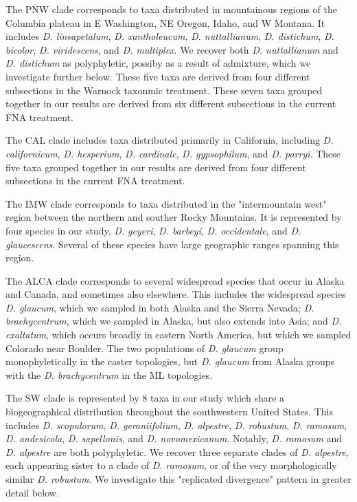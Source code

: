 \documentclass[11pt]{article}
\begin{document}
The PNW clade corresponds to taxa distributed in mountainous regions of the Columbia 
plateau in E Washington, NE Oregon, Idaho, and W Montana. It includes \emph{D. lineapetalum}, 
\emph{D. xantholeucum}, \emph{D. nuttallianum}, \emph{D. distichum}, \emph{D. bicolor}, 
\emph{D. viridescens}, and \emph{D. multiplex}. We recover both \emph{D. nuttallianum}
and \emph{D. distichum} as polyphyletic, possiby as a result of admixture, which we
investigate further below. These five taxa are derived from four
different subsections in the Warnock taxonmic treatment. These seven taxa grouped
together in our results are derived from six different subsections in the current 
FNA treatment.

The CAL clade includes taxa distributed primarily in California, including 
\emph{D. californicum}, \emph{D. hesperium}, \emph{D. cardinale}, 
\emph{D. gypsophilum}, and \emph{D. parryi}. These five taxa grouped together in
our results are derived from four different subsections in the current FNA treatment.

The IMW clade corresponds to taxa distributed in the "intermountain west" region 
between the northern and souther Rocky Mountains.
It is represented by four species in our study, 
\emph{D. geyeri}, \emph{D. barbeyi}, \emph{D. occidentale}, and \emph{D. glaucescens}.
Several of these species have large geographic ranges spanning this region.

The ALCA clade corresponds to several widespread species that occur in Alaska
and Canada, and sometimes also elsewhere. This includes the widespread species
\emph{D. glaucum}, which we sampled in both Alaska and the Sierra Nevada; 
\emph{D. brachycentrum}, which we sampled in Alaska, but also extends into Asia;
and \emph{D. exaltatum}, which occurs broadly in eastern North America, but which 
we sampled Colorado near Boulder. The two populations of \emph{D. glaucum} group
monophyletically in the caster topologies, but \emph{D. glaucum} from Alaska groups 
with the \emph{D. brachycentrum} in the ML topologies.

The SW clade is represented by 8 taxa in our study which share a biogeographical
distribution throughout the southwestern United States. This includes
\emph{D. scopulorum}, \emph{D. geraniifolium}, \emph{D. alpestre},
\emph{D. robustum}, \emph{D. ramosum}, \emph{D. andesicola}, \emph{D. sapellonis},
and \emph{D. novomexicanum}. Notably, \emph{D. ramosum} and \emph{D. alpestre}
are both polyphyletic. We recover three separate clades of \emph{D. alpestre}, each
appearing sister to a clade of \emph{D. ramosum}, or of the very morphologically
similar \emph{D. robustum}. We investigate this "replicated divergence" pattern in 
greater detail below.
\end{document}
